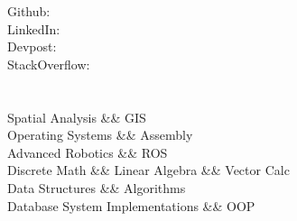 \documentclass[]{hackathons}
\begin{document}
\hfill
\begin{minipage}[t]{0.32\textwidth} 


Github: \href{https://github.com/adriandarian}{} \\
LinkedIn: \href{https://www.linkedin.com/in/adriandarian}{} \\
Devpost: \href{https://www.devpost.com/adarian}{} \\
StackOverflow: \href{https://stackoverflow.com/users/9647369/adarian}{} \\


\section{}

\small


\section{}
Spatial Analysis \&\& GIS \\
Operating Systems \&\& Assembly \\
Advanced Robotics \&\& ROS \\
Discrete Math \&\& Linear Algebra \&\& Vector Calc\\
Data Structures \&\& Algorithms \\
Database System Implementations \&\& OOP \\
\small



\end{minipage}
\end{document}
